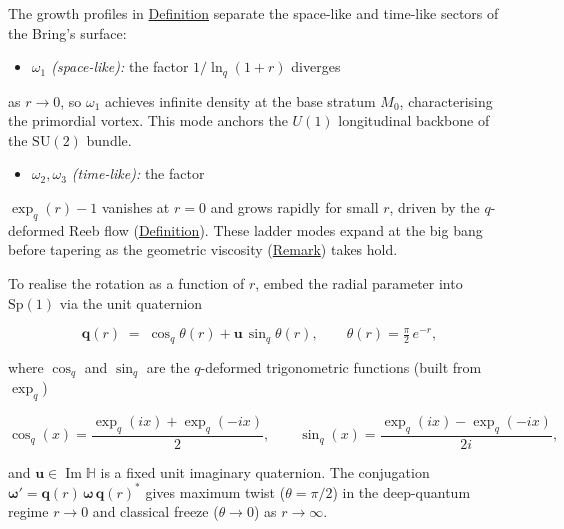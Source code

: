 \begin{remark}
  \label{rem:spectral-dynamics}
The growth profiles in
\hyperref[def:quaternionic-spectral-resolvents]{Definition} separate the space-like
and time-like sectors of the Bring's surface:

\begin{itemize}
  \item \emph{$\omega_1$ (space-like):} the factor $1/\ln_q(1+r)$ diverges
\end{itemize}
  as $r\to 0$, so $\omega_1$ achieves infinite density at the base stratum
  $M_0$, characterising the primordial vortex.  This mode anchors the
  $U(1)$ longitudinal backbone of the $\mathrm{SU}(2)$ bundle.
\begin{itemize}
  \item \emph{$\omega_2,\omega_3$ (time-like):} the factor
\end{itemize}
  $\exp_q(r)-1$ vanishes at $r=0$ and grows rapidly for small $r$,
  driven by the $q$-deformed Reeb flow
  (\hyperref[def:q-reeb-flow]{Definition}).  These ladder modes expand at the big
  bang before tapering as the geometric viscosity
  (\hyperref[rem:q-harmonic-physical]{Remark}) takes hold.

To realise the rotation as a function of $r$, embed the radial parameter
into $\mathrm{Sp}(1)$ via the unit quaternion

\begin{equation}\label{eq:sp1-quaternion}
  \mathbf{q}(r)
  \;=\;
  \cos_q\!\theta(r)+\mathbf{u}\,\sin_q\!\theta(r),
  \qquad
  \theta(r)=\tfrac{\pi}{2}\,e^{-r},
\end{equation}

where $\cos_q$ and $\sin_q$ are the $q$-deformed trigonometric functions
(built from $\exp_q$)

\[
\cos_q(x)=\frac{\exp_q(ix)+\exp_q(-ix)}{2},
  \qquad
  \sin_q(x)=\frac{\exp_q(ix)-\exp_q(-ix)}{2i},
\]

and $\mathbf{u}\in\operatorname{Im}\mathbb{H}$ is a fixed unit imaginary
quaternion.  The conjugation
$\boldsymbol{\omega}'=\mathbf{q}(r)\,\boldsymbol{\omega}\,\mathbf{q}(r)^{*}$
gives maximum twist ($\theta=\pi/2$) in the deep-quantum regime $r\to 0$
and classical freeze ($\theta\to 0$) as $r\to\infty$.
\end{remark}

